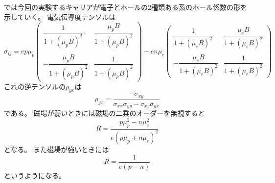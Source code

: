 \documentclass[11pt,dvipdfmx,a4paper]{jsarticle}
\numberwithin{equation}{section}
\begin{document}
では今回の実験するキャリアが電子とホールの2種類ある系のホール係数の形を示していく。
電気伝導度テンソルは
\begin{equation}
	\sigma_{ij} =
	ep\mu_p
	\begin{pmatrix}
		\dfrac{1}{1+(\mu_p B)^2} & \dfrac{\mu_p B}{1+(\mu_p B)^2}\\
		&\\
		-\dfrac{\mu_p B}{1+(\mu_p B)^2} & \dfrac{1}{1+(\mu_p B)^2}
	\end{pmatrix}
	-
	en\mu_e
	\begin{pmatrix}
		\dfrac{1}{1+(\mu_e B)^2} & \dfrac{\mu_e B}{1+(\mu_e B)^2}\\
		&\\
		-\dfrac{\mu_e B}{1+(\mu_e B)^2} & \dfrac{1}{1+(\mu_e B)^2}
	\end{pmatrix}
\end{equation}
これの逆テンソルの\(\rho_{yx}\)は
\begin{equation}
	\rho_{yx} = \frac{-\sigma_{xy}}{\sigma_{xx}\sigma_{yy}-\sigma_{xy}\sigma_{yx}}
\end{equation}
である。
磁場が弱いときには磁場の二乗のオーダーを無視すると
\begin{equation}
	R = \frac{p\mu_p^2 - n\mu_e^2}{e(p\mu_p+n\mu_e)^2}
\end{equation}
となる。
また磁場が強いときには
\begin{equation}
	R = \frac{1}{e(p-n)}
\end{equation}
というようになる\cite{kondo-2009}。 %

\clearpage
\end{document}
